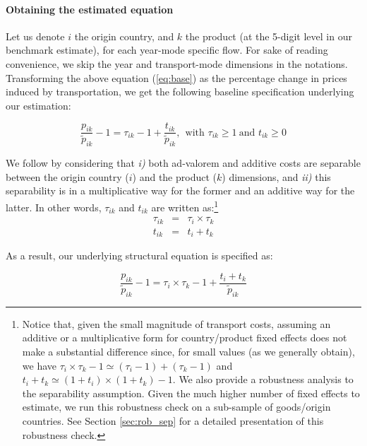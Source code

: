 \documentclass[a4paper,11pt]{article}
\begin{document}
\paragraph{Obtaining the estimated equation} Let us denote $i$ the origin country, and $k$ the product (at the 5-digit level in our benchmark estimate), for each year-mode specific flow. For sake of reading convenience, we skip the year and transport-mode dimensions in the notations. Transforming the above equation (\ref{eq:base}) as the percentage change in prices induced by transportation, we get the following baseline specification underlying our estimation:

\begin{equation}
\frac{p_{ik}}{\widetilde{p}_{ik}} -1 = \tau_{ik}-1 +\frac{t_{ik}}{ \widetilde{p}_{ik}}, ~~\text{with } \tau_{ik}\geq 1 ~\text{and }t_{ik}\geq 0 \label{eq:base_estimee}
\end{equation}

We follow \cite{Irrazabal_2015} by considering that \textit{i)} both ad-valorem and additive costs are separable between the origin country ($i$) and the product ($k$) dimensions, and \textit{ii)} this separability is in a multiplicative way for the former and an additive way for the latter.
In other words, $\tau_{ik}$ and $t_{ik}$ are written as:\footnote{Notice that, given the small magnitude of transport costs, assuming an additive or a multiplicative form for country/product fixed effects does not make a substantial difference since, for small values (as we generally obtain), we have $\tau_i\times \tau_k -1\simeq (\tau_i-1) + (\tau_k -1) $ and $t_i+t_k\simeq (1+t_i)\times(1+t_k)-1$.
We also provide a robustness analysis to the separability assumption. Given the much higher number of fixed effects to estimate, we run this robustness check on a sub-sample of goods/origin countries. See Section \ref{sec:rob_sep} for a detailed presentation of this robustness check.}
\begin{eqnarray}
\tau_{ik} &=& \tau_{i} \times\tau_{k} \label{eq:ad-valorem}\\
t_{ik} &=& t_{i} + t_{k} \label{eq:add}
\end{eqnarray}

\noindent As a result, our underlying structural equation is specified as:

\begin{equation*}
\frac{p_{ik}}{\widetilde{p}_{ik}}-1 =\tau_{i}\times\tau_{k} -1 +\frac{t_{i} + t_{k}}{ \widetilde{p}_{ik}} \label{eq:theory_equation}
\end{equation*}
\end{document}
